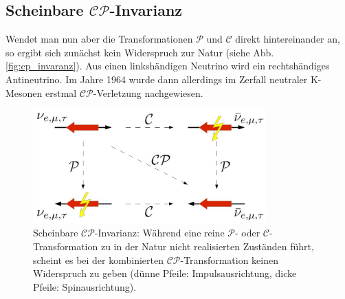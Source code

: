 \documentclass[a4paper]{scrbook}
\begin{document}
\subsection{Scheinbare $\mathcal{CP}$-Invarianz}
Wendet man nun aber die Transformationen $\mathcal{P}$ und $\mathcal{C}$ direkt hintereinander an, so ergibt sich zunächst kein Widerspruch zur Natur (siehe Abb. \ref{fig:cp_invaranz}). Aus einen linkshändigen Neutrino wird ein rechtshändiges Antineutrino. Im Jahre 1964 wurde dann allerdings im Zerfall neutraler K-Mesonen erstmal $\mathcal{CP}$-Verletzung nachgewiesen. \cite{kleinknecht}

\begin{figure}[hptb]
\centering
\includegraphics[width = 0.8\textwidth]{cp_invarianz}
\caption{Scheinbare $\mathcal{CP}$-Invarianz: Während eine reine $\mathcal{P}$- oder $\mathcal{C}$-Transformation zu in der Natur nicht realisierten Zuständen führt, scheint es bei der kombinierten $\mathcal{CP}$-Transformation keinen Widerspruch zu geben (dünne Pfeile: Impulsausrichtung, dicke Pfeile: Spinausrichtung).}
\label{fig:cp_invarianz}
\end{figure}
\end{document}
